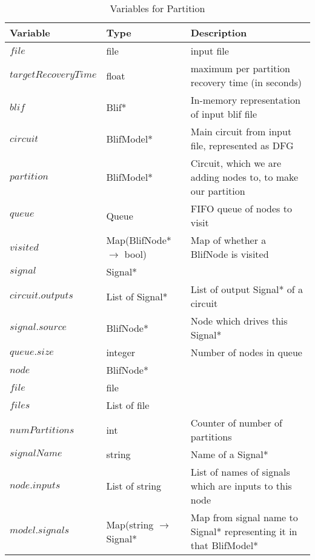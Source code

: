 \documentclass[12pt,draft,oneside]{article} %
\begin{document}
\begin{table}
    \begin{center}
        \begin{tabular}{lll}
        \toprule
        Variable & Type & Description\\
        \midrule
        $file$ & file  & input file\\
        $targetRecoveryTime$ & float & maximum per partition recovery time (in seconds)\\
        $blif$ & Blif* & In-memory representation of input blif file\\
        $circuit$ &  BlifModel* & Main circuit from input file, represented as DFG\\
        $partition$ &  BlifModel* & Circuit, which we are adding nodes to, to make our partition\\
        $queue$ & Queue & FIFO queue of nodes to visit\\
        $visited$ &  Map(BlifNode*$\to$ bool)& Map of whether a BlifNode is visited\\
        $signal$ & Signal* & \\
        $circuit.outputs$ & List of Signal* & List of output Signal* of a circuit\\
        $signal.source$ & BlifNode* & Node which drives this Signal*\\
        $queue.size$ & integer & Number of nodes in queue\\
        $node$ & BlifNode* & \\
        $file$ & file & \\
        $files$ & List of file & \\
        $numPartitions$ & int & Counter of number of partitions\\
        $signalName$ & string & Name of a Signal*\\
        $node.inputs$ & List of string & List of names of signals which are inputs to this node\\
        $model.signals$ & Map(string $\to$ Signal* & Map from signal name to Signal* representing it in that BlifModel*\\
        \bottomrule
        \end{tabular}
        \caption{Variables for Partition}
        \label{varPart}
    \end{center}
\end{table}
\end{document}

